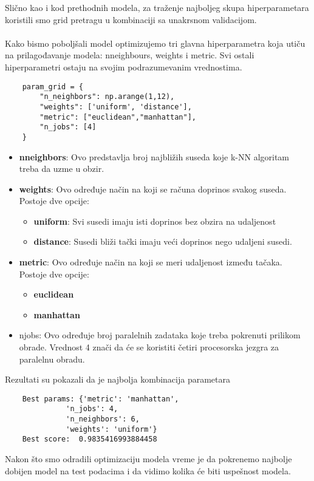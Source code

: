 \documentclass[a4paper,12pt]{article}
\begin{document}
Slično kao i kod prethodnih modela, za traženje najboljeg skupa hiperparametara koristili smo grid pretragu u kombinaciji sa unakrsnom validacijom.
\\\\Kako bismo poboljšali model optimizujemo tri glavna hiperparametra koja utiču na prilagođavanje modela: n\textunderscore neighbours, weights i metric. Svi ostali hiperparametri ostaju na svojim podrazumevanim vrednostima.
\begin{verbatim}
    param_grid = {
        "n_neighbors": np.arange(1,12),
        "weights": ['uniform', 'distance'],
        "metric": ["euclidean","manhattan"],
        "n_jobs": [4]
    }
\end{verbatim}
\begin{itemize}
    \item \textbf{n\textunderscore neighbors}: Ovo predstavlja broj najbližih suseda koje k-NN algoritam treba da uzme u obzir.
    \item \textbf{weights}: Ovo određuje način na koji se računa doprinos svakog suseda. Postoje dve opcije:
    \begin{itemize}
        \item \textbf{uniform}: Svi susedi imaju isti doprinos bez obzira na udaljenost
        \item \textbf{distance}: Susedi bliži tački imaju veći doprinos nego udaljeni susedi.
    \end{itemize}
    \item \textbf{metric}: Ovo određuje način na koji se meri udaljenost između tačaka. Postoje dve opcije:
    \begin{itemize}
        \item \textbf{euclidean}
        \item \textbf{manhattan}
    \end{itemize}
    \item n\textunderscore jobs: Ovo određuje broj paralelnih zadataka koje treba pokrenuti prilikom obrade. Vrednost 4 znači da će se koristiti četiri procesorska jezgra za paralelnu obradu.
\end{itemize}
Rezultati su pokazali da je najbolja kombinacija parametara
\begin{verbatim}
    Best params: {'metric': 'manhattan',
              'n_jobs': 4,
              'n_neighbors': 6,
              'weights': 'uniform'}
    Best score:  0.9835416993884458
\end{verbatim}

Nakon što smo odradili optimizaciju modela vreme je da pokrenemo najbolje dobijen model na test podacima i da vidimo kolika će biti uspešnost modela.
\end{document}
